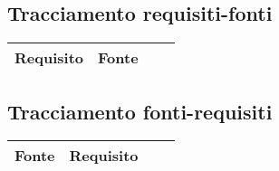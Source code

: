 \subsection{Tracciamento requisiti-fonti}

\begin{center}
  \bgroup
  \def\arraystretch{1.8}
  \begin{longtable}{ | l | p{2cm} | p{4.7cm} | p{2cm} |}
    \hline
    \cellcolor[gray]{0.9} \textbf{Requisito} &   
    \cellcolor[gray]{0.9} \textbf{Fonte}\\ \hline
    \end{longtable}
  \egroup
\end{center} 

\subsection{Tracciamento fonti-requisiti}

\begin{center}
  \bgroup
  \def\arraystretch{1.8}
  \begin{longtable}{ | l | p{2cm} | p{4.7cm} | p{2cm} |}
    \hline
    \cellcolor[gray]{0.9} \textbf{Fonte} &   
    \cellcolor[gray]{0.9} \textbf{Requisito}\\ \hline
    \end{longtable}
  \egroup
\end{center} 
